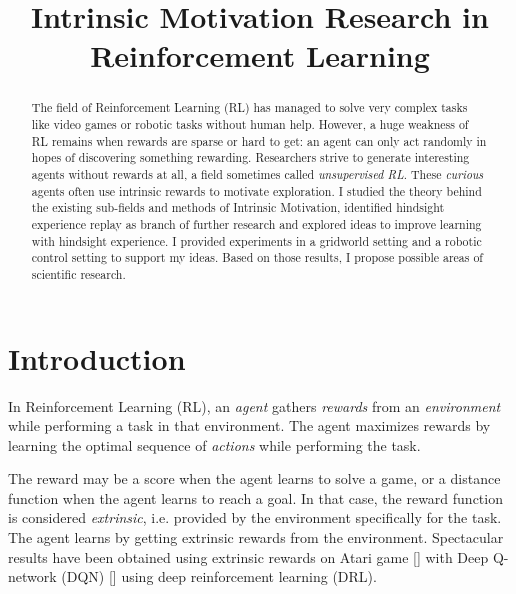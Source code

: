 \documentclass[conference]{IEEEtran}
\begin{document}
\title{
    Intrinsic Motivation Research in Reinforcement Learning
}

\author{
}
\maketitle

\begin{abstract}
The field of Reinforcement Learning (RL) has managed to solve very complex tasks like video games or robotic tasks without human help. However, a huge weakness of RL remains when rewards are sparse or hard to get: an agent can only act randomly in hopes of discovering something rewarding. Researchers strive to generate interesting agents without rewards at all, a field sometimes called \textit{unsupervised RL}. These \textit{curious} agents often use intrinsic rewards to motivate exploration. I studied the theory behind the existing sub-fields and methods of Intrinsic Motivation, identified hindsight experience replay as branch of further research and explored ideas to improve learning with hindsight experience. I provided experiments in a gridworld setting and a robotic control setting to support my ideas. Based on those results, I propose possible areas of scientific research.
\end{abstract}

\section{Introduction}

In Reinforcement Learning (RL), an \textit{agent} gathers \textit{rewards} from an \textit{environment} while performing a task in that environment. The agent maximizes rewards by learning the optimal sequence of \textit{actions} while performing the task.

The reward may be a score when the agent learns to solve a game, or a distance function when the agent learns to reach a goal. In that case, the reward function is considered \textit{extrinsic}, i.e. provided by the environment specifically for the task. The agent learns by getting extrinsic rewards from the environment. Spectacular results have been obtained using extrinsic rewards on Atari game [\cite{bellemare2013arcade}] with Deep Q-network (DQN) [\cite{mnih2015human}] using deep reinforcement learning (DRL). 
\end{document}
